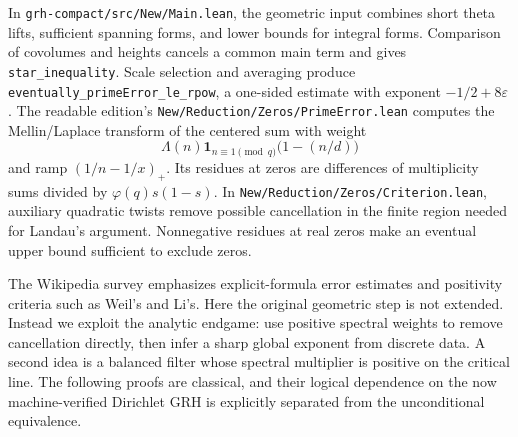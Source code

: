 \documentclass[11pt]{article}
\theoremstyle{remark}\newtheorem{remark}[theorem]{Remark}
\begin{document}
In \nolinkurl{grh-compact/src/New/Main.lean}, the geometric input combines short theta lifts, sufficient spanning forms, and lower bounds for integral forms. Comparison of covolumes and heights cancels a common main term and gives \texttt{star\_inequality}. Scale selection and averaging produce \nolinkurl{eventually_primeError_le_rpow}, a one-sided estimate with exponent $-1/2+8\varepsilon$. The readable edition's \nolinkurl{New/Reduction/Zeros/PrimeError.lean} computes the Mellin/Laplace transform of the centered sum with weight
\[
\Lambda(n)\mathbf1_{n\equiv1\pmod q}\bigl(1-(n/d)\bigr)
\]
and ramp $(1/n-1/x)_+$. Its residues at zeros are differences of multiplicity sums divided by $\varphi(q)s(1-s)$. In \nolinkurl{New/Reduction/Zeros/Criterion.lean}, auxiliary quadratic twists remove possible cancellation in the finite region needed for Landau's argument. Nonnegative residues at real zeros make an eventual upper bound sufficient to exclude zeros.

The Wikipedia survey \cite{wiki} emphasizes explicit-formula error estimates and positivity criteria such as Weil's and Li's. Here the original geometric step is not extended. Instead we exploit the analytic endgame: use positive spectral weights to remove cancellation directly, then infer a sharp global exponent from discrete data. A second idea is a balanced filter whose spectral multiplier is positive on the critical line. The following proofs are classical, and their logical dependence on the now machine-verified Dirichlet GRH is explicitly separated from the unconditional equivalence.
\end{document}

